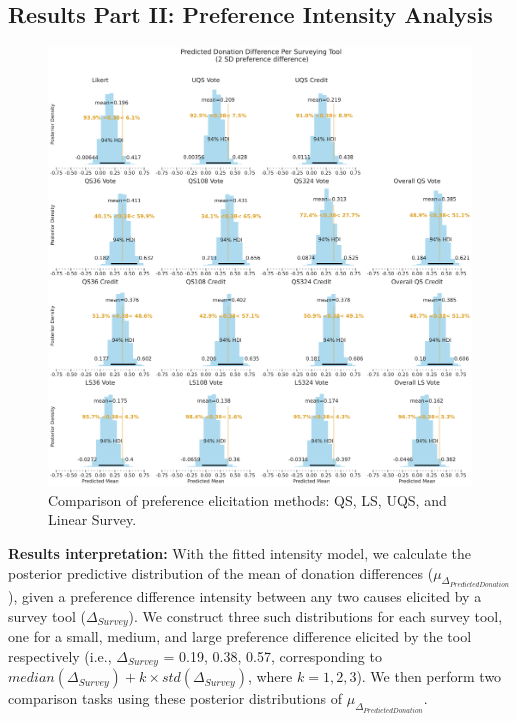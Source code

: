 \subsection{Results Part II: Preference Intensity Analysis}
\label{sec:result_2}

\begin{figure}[h]
    \centering
    \includegraphics[width=\textwidth]{content/image/intensity_2sd.pdf}
    \caption{Comparison of preference elicitation methods: QS, LS, UQS, and Linear Survey.}
    \label{fig:comparison}
\end{figure}


\textbf{Results interpretation:} With the fitted intensity model, we calculate the posterior predictive distribution of the mean of donation differences ($\mu_{\Delta_{PredictedDonation}}$), given a preference difference intensity between any two causes elicited by a survey tool ($\Delta_{Survey}$). We construct three such distributions for each survey tool, one for a small, medium, and large preference difference elicited by the tool respectively (i.e., $\Delta_{Survey}$ = 0.19, 0.38, 0.57, corresponding to $median(\Delta_{Survey})+k \times std(\Delta_{Survey})$, where $k=1, 2, 3$). We then perform two comparison tasks using these posterior distributions of $\mu_{\Delta_{PredictedDonation}}$. 

